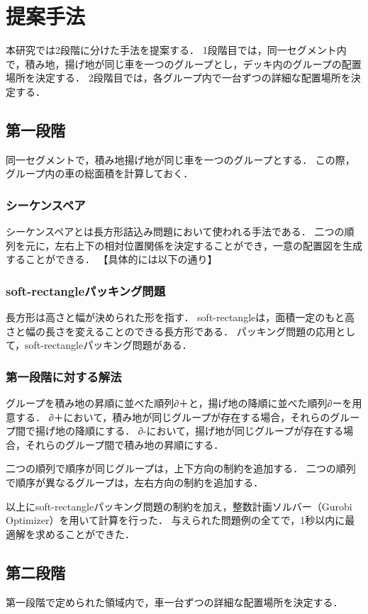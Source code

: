 \chapter{提案手法}\label{method}
本研究では2段階に分けた手法を提案する．
1段階目では，同一セグメント内で，積み地，揚げ地が同じ車を一つのグループとし，デッキ内のグループの配置場所を決定する．
2段階目では，各グループ内で一台ずつの詳細な配置場所を決定する．


\section{第一段階}
同一セグメントで，積み地揚げ地が同じ車を一つのグループとする．
この際，グループ内の車の総面積を計算しておく．

\subsection{シーケンスペア}
シーケンスペアとは長方形詰込み問題において使われる手法である．
二つの順列を元に，左右上下の相対位置関係を決定することができ，一意の配置図を生成することができる．
【具体的には以下の通り】

\subsection{soft-rectangleパッキング問題}
長方形は高さと幅が決められた形を指す．
soft-rectangleは，面積一定のもと高さと幅の長さを変えることのできる長方形である．
パッキング問題の応用として，soft-rectangleパッキング問題がある．

\subsection{第一段階に対する解法}
グループを積み地の昇順に並べた順列∂＋と，揚げ地の降順に並べた順列∂ーを用意する．
∂＋において，積み地が同じグループが存在する場合，それらのグループ間で揚げ地の降順にする．
∂-において，揚げ地が同じグループが存在する場合，それらのグループ間で積み地の昇順にする．

二つの順列で順序が同じグループは，上下方向の制約を追加する．
二つの順列で順序が異なるグループは，左右方向の制約を追加する．

以上にsoft-rectangleパッキング問題の制約を加え，整数計画ソルバー（Gurobi Optimizer）を用いて計算を行った．
与えられた問題例の全てで，1秒以内に最適解を求めることができた．


\section{第二段階}
第一段階で定められた領域内で，車一台ずつの詳細な配置場所を決定する．

